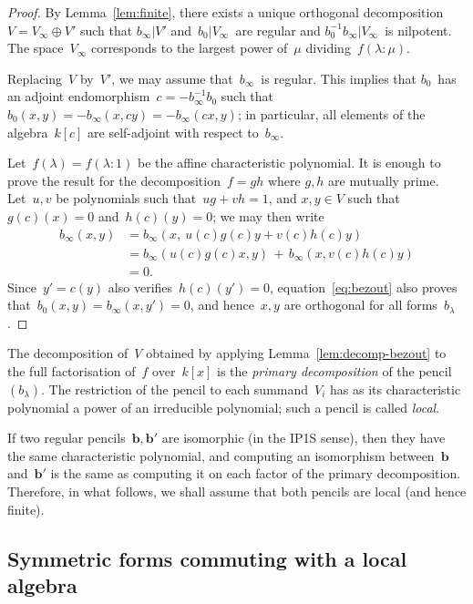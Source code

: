 \documentclass{article}%
\begin{document}
\begin{proof}
By Lemma~\ref{lem:finite}, there exists
a unique orthogonal decomposition~$V = V_{∞} ⊕ V'$
such that $b_{∞} | V'$ and~$b_{0} | V_{∞}$~are regular
and $b_{0}^{-1} b_{∞} | V_{∞}$~is nilpotent.
The space~$V_{∞}$ corresponds to the largest power of~$μ$ dividing~$f(λ:μ)$.

Replacing~$V$ by~$V'$, we may assume that~$b_{∞}$~is regular.
This implies that $b_0$~has an adjoint endomorphism~$c = -b_{∞}^{-1} b_0$
such that~$b_0(x,y) = -b_{∞}(x, c y) = -b_{∞}(c x, y)$;
in particular, all elements of the algebra~$k[c]$
are self-adjoint with respect to~$b_{∞}$.

Let~$f(λ) = f(λ: 1)$ be the affine characteristic polynomial.
It is enough to prove the result for the decomposition~$f = gh$
where $g, h$ are mutually prime.
Let~$u, v$ be polynomials such that~$ug + vh = 1$,
and $x, y ∈ V$ such that~$g(c)(x) = 0$ and~$h(c)(y) = 0$;
we may then write
\begin{equation}\label{eq:bezout}
\begin{split}
b_{∞} (x, y) & = b_{∞} (x,\: u(c) g(c) y + v(c) h(c) y ) \\
&= b_{∞} (u(c) g(c) x, y) \,+\, b_{∞} (x, v(c) h(c) y) \\
&= 0.
\end{split}
\end{equation}
Since~$y' = c(y)$ also verifies~$h(c)(y') = 0$, equation~\eqref{eq:bezout}
also proves that~$b_{0}(x,y) = b_{∞}(x,y') = 0$, and hence~$x, y$ are
orthogonal for all forms~$b_{λ}$.
\end{proof}%

The decomposition of~$V$ obtained by applying
Lemma~\ref{lem:decomp-bezout} to the full factorisation of~$f$
over~$k[x]$ is the \emph{primary decomposition} of the pencil~$(b_{λ})$.
The restriction of the pencil to each summand~$V_i$ has as its
characteristic polynomial a power of an irreducible polynomial;
such a pencil is called \emph{local}.

If two regular pencils~$\bm{b}, \bm{b}'$ are isomorphic (in the IP1S sense),
then they have the same characteristic polynomial,
and computing an isomorphism between~$\bm{b}$ and~$\bm{b}'$
is the same as computing it on each factor of the primary decomposition.
Therefore, in what follows, we shall assume that
both pencils are local (and hence finite).

\subsection{Symmetric forms commuting with a local algebra}%
\label{ss:commute}
\end{document}
